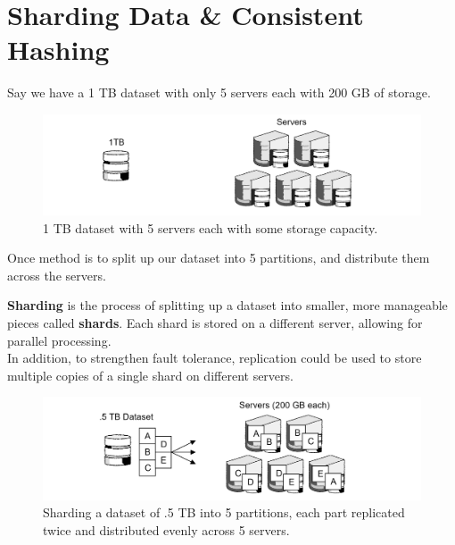\newpage 

\section{Sharding Data \& Consistent Hashing}
\label{sec:shard}

Say we have a 1 TB dataset with only 5 servers each with 200 GB of storage.

\begin{figure}[h]

    \centering
    \includegraphics[width=\textwidth]{Sections/shard/server.png}
    \caption{1 TB dataset with 5 servers each with some storage capacity.}
    \label{fig:shard}
\end{figure}

\noindent
Once method is to split up our dataset into 5 partitions, and distribute them across the servers.
\begin{Def}[Sharding]

    \textbf{Sharding} is the process of splitting up a dataset into smaller, more manageable pieces called \textbf{shards}. Each shard is stored on a different server, allowing for parallel processing.\\

    \noindent
    In addition, to strengthen fault tolerance, replication could be used to store multiple copies of a single shard on different servers.
\end{Def}

\begin{figure}[h]

    \centering
    \includegraphics[width=\textwidth]{Sections/shard/shard.png}
    \caption{Sharding a dataset of .5 TB into 5 partitions, each part replicated twice and distributed evenly across 5 servers.}
    \label{fig:shard}
\end{figure}

